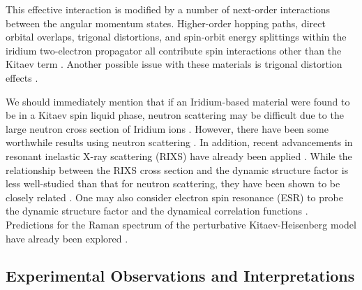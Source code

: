 \documentclass[aps,pra,preprint,groupedaddress]{revtex4-1}
\newcommand{\1}{\mathds{1}}
\begin{document}

This effective interaction is modified by a number of next-order interactions between the angular momentum states. Higher-order hopping paths, direct orbital overlaps, trigonal distortions, and spin-orbit energy splittings within the iridium two-electron propagator all contribute spin
interactions other than the Kitaev term \cite{Kimchi,Rau}. Another possible issue with these materials is trigonal distortion effects \cite{Jin, Bhattacharjee, Yang, Shitade}.



We should immediately mention that if an Iridium-based material were found to be in a Kitaev spin liquid phase, neutron scattering may be difficult due to the large neutron cross section of Iridium ions \cite{Powell, Ament3,Gretarsson3}. However, there have been some worthwhile results using neutron scattering \cite{Ye}. In addition, recent advancements in resonant inelastic X-ray scattering (RIXS) \cite{Ament,Ament2,Ament3} have already been applied \cite{Gretarsson1,Gretarsson2,Gretarsson3}. %
While the relationship between the RIXS cross section and the dynamic structure factor is less well-studied than that for neutron scattering, they have been shown to be closely related \cite{Jia}. One may also consider electron spin resonance (ESR) to probe the dynamic structure factor and the dynamical correlation functions \cite{Maeda,Knolle}. Predictions for the Raman spectrum of the perturbative Kitaev-Heisenberg model have already been explored \cite{Perkins}.


\subsection{Experimental Observations and Interpretations}
\end{document}
